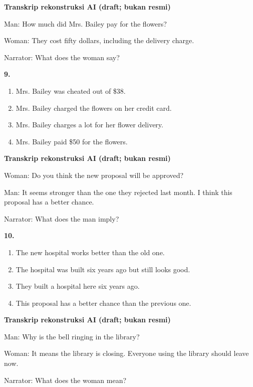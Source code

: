 \documentclass[12pt]{article}
\begin{document}
\par
\vspace{0.25\baselineskip}
\begin{exampleblock}
\textbf{Transkrip rekonstruksi AI (draft; bukan resmi)}\par
Man: How much did Mrs. Bailey pay for the flowers?\par
Woman: They cost fifty dollars, including the delivery charge.\par
Narrator: What does the woman say?\par
\end{exampleblock}
\noindent\textbf{9.}
\begin{enumerate}[label=(\Alph*),leftmargin=*,itemsep=0.2em]
\item Mrs. Bailey was cheated out of \$38.
\item Mrs. Bailey charged the flowers on her credit card.
\item Mrs. Bailey charges a lot for her flower delivery.
\item Mrs. Bailey paid \$50 for the flowers.
\end{enumerate}
\par
\vspace{0.25\baselineskip}
\begin{exampleblock}
\textbf{Transkrip rekonstruksi AI (draft; bukan resmi)}\par
Woman: Do you think the new proposal will be approved?\par
Man: It seems stronger than the one they rejected last month. I think this proposal has a better chance.\par
Narrator: What does the man imply?\par
\end{exampleblock}
\noindent\textbf{10.}
\begin{enumerate}[label=(\Alph*),leftmargin=*,itemsep=0.2em]
\item The new hospital works better than the old one.
\item The hospital was built six years ago but still looks good.
\item They built a hospital here six years ago.
\item This proposal has a better chance than the previous one.
\end{enumerate}
\par
\vspace{0.25\baselineskip}
\begin{exampleblock}
\textbf{Transkrip rekonstruksi AI (draft; bukan resmi)}\par
Man: Why is the bell ringing in the library?\par
Woman: It means the library is closing. Everyone using the library should leave now.\par
Narrator: What does the woman mean?\par
\end{exampleblock}
\end{document}

